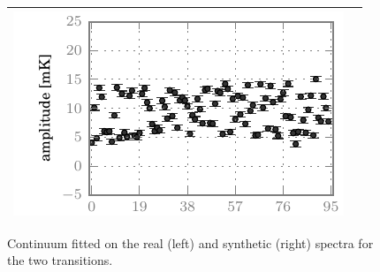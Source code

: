 \begin{figure}
\begin{tabular}{@{}c@{}c@{}}
        \includegraphics{spread_98_base_ampl_noisy}            \\
    \bottomrule
    \end{tabular}
    \caption{
        Continuum fitted on the real (left) and synthetic (right) spectra for the two transitions.
    }
    \label{fig:fit_base}
\end{figure}


